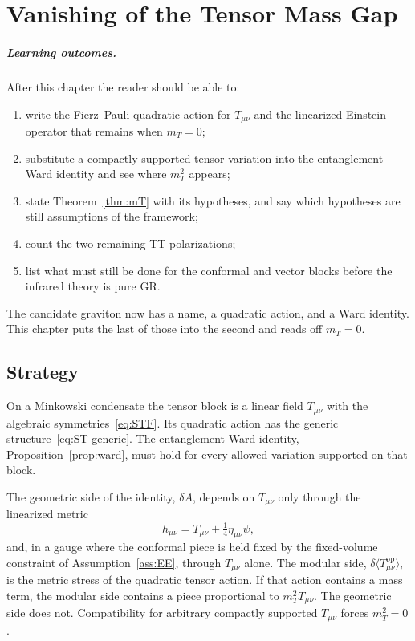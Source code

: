 \chapter[The tensor mass gap]{Vanishing of the Tensor Mass Gap}
\label{ch:massless-tensor}

\paragraph{Learning outcomes.}
After this chapter the reader should be able to:
\begin{enumerate}
  \item write the Fierz--Pauli quadratic action for \(T_{\mu\nu}\)
        and the linearized Einstein operator that remains when
        \(m_T=0\);
  \item substitute a compactly supported tensor variation into the
        entanglement Ward identity and see where \(m_T^2\) appears;
  \item state Theorem~\ref{thm:mT} with its hypotheses, and say which
        hypotheses are still assumptions of the framework;
  \item count the two remaining TT polarizations;
  \item list what must still be done for the conformal and vector
        blocks before the infrared theory is pure GR.
\end{enumerate}

The candidate graviton now has a name, a quadratic action, and a
Ward identity. This chapter puts the last of those into the second
and reads off \(m_T=0\).

\section{Strategy}
\label{sec:ch7-strategy}

On a Minkowski condensate the tensor block is a linear field
\(T_{\mu\nu}\) with the algebraic symmetries~\eqref{eq:STF}. Its
quadratic action has the generic structure~\eqref{eq:ST-generic}.
The entanglement Ward identity, Proposition~\ref{prop:ward}, must
hold for every allowed variation supported on that block.

The geometric side of the identity, \(\delta A\), depends on
\(T_{\mu\nu}\) only through the linearized metric
\begin{equation}
  \label{eq:h-is-T}
  h_{\mu\nu}=T_{\mu\nu}+\tfrac14\eta_{\mu\nu}\psi,
\end{equation}
and, in a gauge where the conformal piece is held fixed by the
fixed-volume constraint of Assumption~\ref{ass:EE}, through
\(T_{\mu\nu}\) alone. The modular side,
\(\delta\langle T_{\mu\nu}^{\mathrm{op}}\rangle\), is the metric
stress of the quadratic tensor action. If that action contains a
mass term, the modular side contains a piece proportional to
\(m_T^2 T_{\mu\nu}\). The geometric side does not. Compatibility for
arbitrary compactly supported \(T_{\mu\nu}\) forces \(m_T^2=0\).

